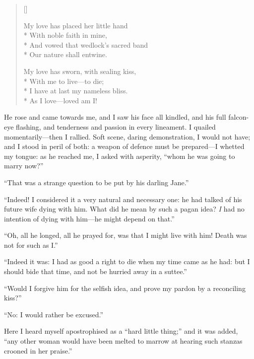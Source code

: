 \begin{verse}[\versewidth]
{		My love has placed her little hand\\*
		\hspace*{0.333em}\hspace*{0.333em} With noble faith in mine,\\*
		And vowed that wedlock's sacred band\\*
		\hspace*{0.333em}\hspace*{0.333em} Our nature shall entwine.

		My love has sworn, with sealing kiss,\\*
		\hspace*{0.333em}\hspace*{0.333em} With me to live---to die;\\*
		I have at last my nameless bliss.\\*
		\hspace*{0.333em}\hspace*{0.333em} As I love---loved am I!}
\end{verse}

He rose and came towards me, and I saw his face all kindled, and his
full falcon-eye flashing, and tenderness and passion in every
lineament.  I quailed momentarily---then I rallied.  Soft scene, daring
demonstration, I would not have; and I stood in peril of both: a weapon
of defence must be prepared---I whetted my tongue: as he reached me, I
asked with asperity, \enquote{whom he was going to marry now?}

\enquote{That was a strange question to be put by his darling Jane.}

\enquote{Indeed!  I considered it a very natural and necessary one: he had
	talked of his future wife dying with him.  What did he mean by such a
	pagan idea?  \emph{I} had no intention of dying with him---he might
	depend on that.}

\enquote{Oh, all he longed, all he prayed for, was that I might live
	with him!  Death was not for such as I\@.}

\enquote{Indeed it was: I had as good a right to die when my time came
	as he had: but I should bide that time, and not be hurried away in a
	suttee.}

\enquote{Would I forgive him for the selfish idea, and prove my pardon
	by a reconciling kiss?}

\enquote{No: I would rather be excused.}

Here I heard myself apostrophised as a \enquote{hard little thing;} and
it was added, \enquote{any other woman would have been melted to marrow
	at hearing such stanzas crooned in her praise.}

